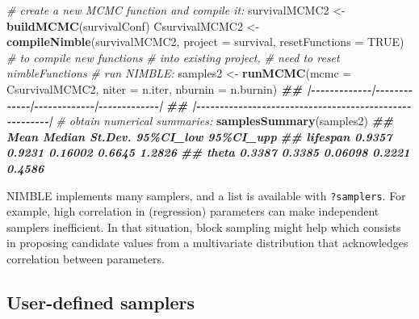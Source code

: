 \documentclass[
  12pt,
]{krantz}
\newenvironment{Shaded}{\begin{snugshade}}{\end{snugshade}}
\newcommand{\AttributeTok}[1]{\textcolor[rgb]{0.13,0.29,0.53}{#1}}
\newcommand{\CommentTok}[1]{\textcolor[rgb]{0.56,0.35,0.01}{\textit{#1}}}
\newcommand{\ConstantTok}[1]{\textcolor[rgb]{0.56,0.35,0.01}{#1}}
\newcommand{\DocumentationTok}[1]{\textcolor[rgb]{0.56,0.35,0.01}{\textbf{\textit{#1}}}}
\newcommand{\FunctionTok}[1]{\textcolor[rgb]{0.13,0.29,0.53}{\textbf{#1}}}
\newcommand{\NormalTok}[1]{#1}
\newcommand{\OtherTok}[1]{\textcolor[rgb]{0.56,0.35,0.01}{#1}}
\begin{document}
\begin{Shaded}
\begin{Highlighting}[]
\CommentTok{\# create a new MCMC function and compile it:}
\NormalTok{survivalMCMC2 }\OtherTok{\textless{}{-}} \FunctionTok{buildMCMC}\NormalTok{(survivalConf)}
\NormalTok{CsurvivalMCMC2 }\OtherTok{\textless{}{-}} \FunctionTok{compileNimble}\NormalTok{(survivalMCMC2, }
                                \AttributeTok{project =}\NormalTok{ survival,}
                                \AttributeTok{resetFunctions =} \ConstantTok{TRUE}\NormalTok{) }\CommentTok{\# to compile new functions }
                                                       \CommentTok{\# into existing project, }
                                                       \CommentTok{\# need to reset nimbleFunctions}
\CommentTok{\# run NIMBLE:}
\NormalTok{samples2 }\OtherTok{\textless{}{-}} \FunctionTok{runMCMC}\NormalTok{(}\AttributeTok{mcmc =}\NormalTok{ CsurvivalMCMC2, }
                    \AttributeTok{niter =}\NormalTok{ n.iter,}
                    \AttributeTok{nburnin =}\NormalTok{ n.burnin)}
\DocumentationTok{\#\# |{-}{-}{-}{-}{-}{-}{-}{-}{-}{-}{-}{-}{-}|{-}{-}{-}{-}{-}{-}{-}{-}{-}{-}{-}{-}{-}|{-}{-}{-}{-}{-}{-}{-}{-}{-}{-}{-}{-}{-}|{-}{-}{-}{-}{-}{-}{-}{-}{-}{-}{-}{-}{-}|}
\DocumentationTok{\#\# |{-}{-}{-}{-}{-}{-}{-}{-}{-}{-}{-}{-}{-}{-}{-}{-}{-}{-}{-}{-}{-}{-}{-}{-}{-}{-}{-}{-}{-}{-}{-}{-}{-}{-}{-}{-}{-}{-}{-}{-}{-}{-}{-}{-}{-}{-}{-}{-}{-}{-}{-}{-}{-}{-}{-}|}
\CommentTok{\# obtain numerical summaries:}
\FunctionTok{samplesSummary}\NormalTok{(samples2)}
\DocumentationTok{\#\#            Mean Median St.Dev. 95\%CI\_low 95\%CI\_upp}
\DocumentationTok{\#\# lifespan 0.9357 0.9231 0.16002    0.6645    1.2826}
\DocumentationTok{\#\# theta    0.3387 0.3385 0.06098    0.2221    0.4586}
\end{Highlighting}
\end{Shaded}

NIMBLE implements many samplers, and a list is available with \texttt{?samplers}. For example, high correlation in (regression) parameters can make independent samplers inefficient. In that situation, block sampling might help which consists in proposing candidate values from a multivariate distribution that acknowledges correlation between parameters.

\subsection{User-defined samplers}\label{user-defined-samplers}
\end{document}
